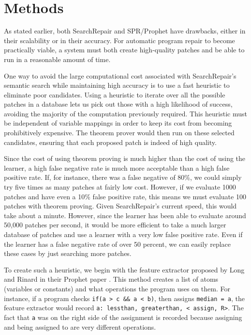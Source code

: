 \documentclass[conference]{IEEEtran}
\begin{document}
\section{Methods}


As stated earlier, both SearchRepair and SPR/Prophet have drawbacks, either in their scalability or in their accuracy. 
For automatic program repair to become practically viable, a system must both create high-quality patches and be able to run in a reasonable amount of time.

One way to avoid the large computational cost associated with SearchRepair's semantic search while maintaining high accuracy is to use a fast heuristic to eliminate poor candidates. 
Using a heuristic to iterate over all the possible patches in a database lets us pick out those with a high likelihood of success, avoiding the majority of the computation previously required. 
This heuristic must be independent of variable mappings in order to keep its cost from becoming prohibitively expensive. 
The theorem prover would then run on these selected candidates, ensuring that each proposed patch is indeed of high quality.

Since the cost of using theorem proving is much higher than the cost of using the learner, a high false negative rate is much more acceptable than a high false positive rate. 
If, for instance, there was a false negative of 80\%, we could simply try five times as many patches at fairly low cost. 
However, if we evaluate 1000 patches and have even a 10\% false positive rate, this means we must evaluate 100 patches with theorem proving. 
Given SearchRepair's current speed, this would take about a minute. 
However, since the learner has been able to evaluate around 50,000 patches per second, it would be more efficient to take a much larger database of patches and use a learner with a very low false positive rate. 
Even if the learner has a false negative rate of over 50 percent, we can easily replace these cases by just searching more patches.

To create such a heuristic, we begin with the feature extractor proposed by Long and Rinard in their Prophet paper \cite{Prophet}. 
This method creates a list of atoms (variables or constants) and what operations the program uses on them. 
For instance, if a program checks \texttt{if(a > c \&\& a < b)}, then assigns \texttt{median = a}, the feature extractor would record \texttt{a: lessthan, greaterthan, < assign, R>}. 
The fact that \texttt{a} was on the right side of the assignment is recorded because assigning and being assigned to are very different operations. 
\end{document}
